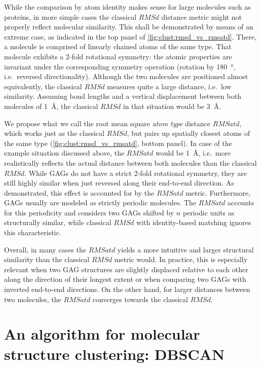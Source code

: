 While the comparison by atom identity makes sense for large molecules such as
proteins, in more simple cases the classical $RMSd$ distance metric might not
properly reflect molecular similarity. This shall be demonstrated by means of an
extreme case, as indicated in the top panel of
\cref{fig:clust:rmsd_vs_rmsatd}. There, a molecule is comprised of linearly
chained atoms of the same type. That molecule exhibits a 2-fold rotational
symmetry: the atomic properties are invariant under the corresponding symmetry
operation (rotation by \SI{180}{\degree}, i.e.\ reversed directionality).
Although the two molecules are positioned almost equivalently, the classical
$RMSd$ measures quite a large distance, i.e.\ low similarity. Assuming bond
lengths and a vertical displacement between both molecules of \SI{1}{\angstrom},
the classical $RMSd$ in that situation would be \SI{3}{\angstrom}.

We propose what we call the root mean square \textit{atom type} distance
$RMSatd$, which works just as the classical $RMSd$, but pairs up spatially
closest atoms of the same type (\cref{fig:clust:rmsd_vs_rmsatd}, bottom panel).
In case of the example situation discussed above, the $RMSatd$ would be
\SI{1}{\angstrom}, i.e.\ more realistically reflects the actual distance between
both molecules than the classical $RMSd$. While GAGs do not have a strict 2-fold
rotational symmetry, they are still highly similar when just reversed along
their end-to-end direction. As demonstrated, this effect is accounted for by the
$RMSatd$ metric. Furthermore, GAGs usually are modeled as strictly periodic
molecules. The $RMSatd$ accounts for this periodicity and considers two GAGs
shifted by $n$ periodic units as structurally similar, while classical $RMSd$
with identity-based matching ignores this characteristic.

Overall, in many cases the $RMSatd$ yields a more intuitive and larger
structural similarity than the classical $RMSd$ metric would. In practice, this
is especially relevant when two GAG structures are slightly displaced relative
to each other along the direction of their longest extent or when comparing two
GAGs with inverted end-to-end directions. On the other hand, for larger
distances between two molecules, the $RMSatd$ converges towards the classical
$RMSd$.


\section{An algorithm for molecular structure clustering: DBSCAN}

